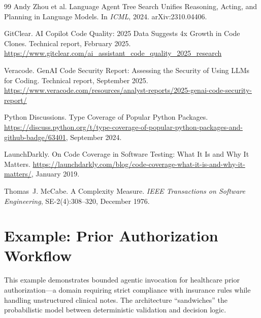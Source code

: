 \documentclass[11pt]{article}
\begin{document}
\begin{thebibliography}{99}
Andy Zhou et al.
\newblock Language Agent Tree Search Unifies Reasoning, Acting, and Planning in Language Models.
\newblock In \emph{ICML}, 2024.
\newblock arXiv:2310.04406.

GitClear.
\newblock AI Copilot Code Quality: 2025 Data Suggests 4x Growth in Code Clones.
\newblock Technical report, February 2025.
\newblock \url{https://www.gitclear.com/ai_assistant_code_quality_2025_research}

Veracode.
 GenAI Code Security Report: Assessing the Security of Using LLMs for Coding.
\newblock Technical report, September 2025.
\newblock \url{https://www.veracode.com/resources/analyst-reports/2025-genai-code-security-report/}

Python Discussions.
\newblock Type Coverage of Popular Python Packages.
\newblock \url{https://discuss.python.org/t/type-coverage-of-popular-python-packages-and-github-badge/63401}, September 2024.

LaunchDarkly.
\newblock On Code Coverage in Software Testing: What It Is and Why It Matters.
\newblock \url{https://launchdarkly.com/blog/code-coverage-what-it-is-and-why-it-matters/}, January 2019.

Thomas~J. McCabe.
\newblock A Complexity Measure.
\newblock \emph{IEEE Transactions on Software Engineering}, SE-2(4):308--320, December 1976.

\end{thebibliography}


\appendix

\section{Example: Prior Authorization Workflow}
\label{app:example}

This example demonstrates bounded agentic invocation for healthcare prior authorization---a domain requiring strict compliance with insurance rules while handling unstructured clinical notes. The architecture ``sandwiches'' the probabilistic model between deterministic validation and decision logic.
\end{document}
